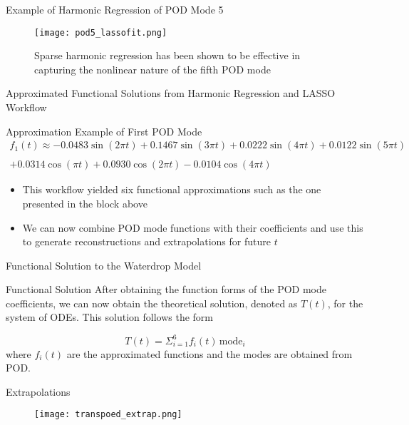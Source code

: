 \documentclass[aspectratio=169,xcolor=dvipsnames]{beamer}
\begin{document}
\begin{frame}{Example of Harmonic Regression of POD Mode 5}
    \begin{figure}
        \centering
        \texttt{[image: pod5\_lassofit.png]}
        \label{fig:pod5_lasso}
        \caption{Sparse harmonic regression has been shown to be effective in capturing the nonlinear nature of the fifth POD mode}
    \end{figure}
\end{frame}

\begin{frame}{Approximated Functional Solutions from Harmonic Regression and LASSO Workflow}
    \begin{block}{Approximation Example of First POD Mode}
    \begin{align*}
        f_1(t) \approx 
-0.0483\sin(2\pi t) + 0.1467\sin(3\pi t) + 0.0222\sin(4\pi t) + 0.0122\sin(5\pi t) \\\\
+ 0.0314\cos(\pi t) + 0.0930\cos(2\pi t) - 0.0104\cos(4\pi t)
\end{align*}
\end{block}
\begin{itemize}
\item This workflow yielded six functional approximations such as the one presented in the block above
\item We can now combine POD mode functions with their coefficients and use this to generate reconstructions and extrapolations for future $t$
\end{itemize}
\end{frame}

\begin{frame}{Functional Solution to the Waterdrop Model}
\begin{block}{Functional Solution}
    After obtaining the function forms of the POD mode coefficients, we can now obtain the theoretical solution, denoted as $T(t)$, for the system of ODEs. This solution follows the form

\begin{equation}
    T(t) = \Sigma_{i=1}^{6} f_{i}(t) \, \text{mode}_{i}
    \label{eqn:T_solution}
\end{equation}
where $f_{i}(t)$ are the approximated functions and the modes are obtained from POD.
\end{block}
\end{frame}

\begin{frame}{Extrapolations}
\begin{figure}
    \centering
    \texttt{[image: transpoed\_extrap.png]}
    \label{fig:extraps}
\end{figure}
\end{frame}
\end{document}
